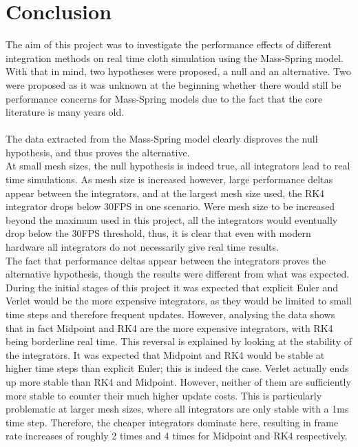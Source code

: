 \chapter{Conclusion}

The aim of this project was to investigate the performance effects of different integration methods on real time cloth simulation using the Mass-Spring model. With that in mind, two hypotheses were proposed, a null and an alternative. Two were proposed as it was unknown at the beginning whether there would still be performance concerns for Mass-Spring models due to the fact that the core literature is many years old.
\\\\The data extracted from the Mass-Spring model clearly disproves the null hypothesis, and thus proves the alternative.
\\At small mesh sizes, the null hypothesis is indeed true, all integrators lead to real time simulations. As mesh size is increased however, large performance deltas appear between the integrators, and at the largest mesh size used, the RK4 integrator drops below 30FPS in one scenario. Were mesh size to be increased beyond the maximum used in this project, all the integrators would eventually drop below the 30FPS threshold, thus, it is clear that even with modern hardware all integrators do not necessarily give real time results. 
\\The fact that performance deltas appear between the integrators proves the alternative hypothesis, though the results were different from what was expected. During the initial stages of this project it was expected that explicit Euler and Verlet would be the more expensive integrators, as they would be limited to small time steps and therefore frequent updates. However, analysing the data shows that in fact Midpoint and RK4 are the more expensive integrators, with RK4 being borderline real time. This reversal is explained by looking at the stability of the integrators. It was expected that Midpoint and RK4 would be stable at higher time steps than explicit Euler; this is indeed the case. Verlet actually ends up more stable than RK4 and Midpoint. However, neither of them are sufficiently more stable to counter their much higher update costs. This is particularly problematic at larger mesh sizes, where all integrators are only stable with a 1ms time step. Therefore, the cheaper integrators dominate here, resulting in frame rate increases of roughly 2 times and 4 times for Midpoint and RK4 respectively.
